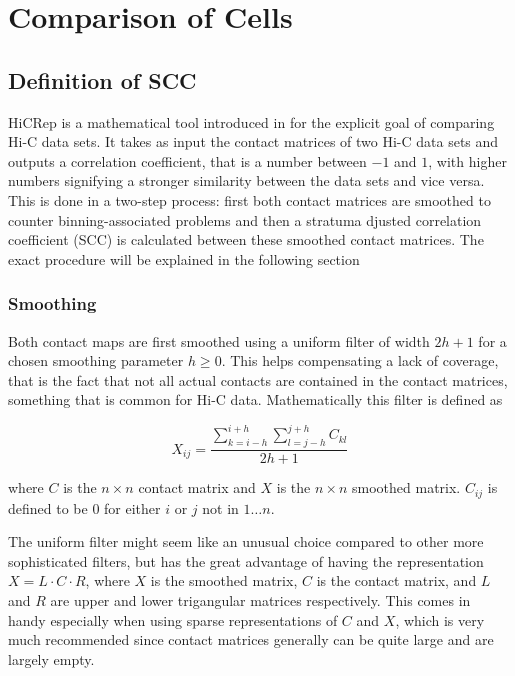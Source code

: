 
\chapter{Comparison of Cells} %
\label{cha:comparison_of_cells}

\section{Definition of SCC} %
\label{sec:definition_of_scc}

HiCRep is a mathematical tool introduced in \cite{yang_hicrep_2017} for the explicit goal of comparing Hi-C data sets. It takes as input the contact matrices of two Hi-C data sets and outputs a correlation coefficient, that is a number between \(-1\) and \(1\), with higher numbers signifying a stronger similarity between the data sets and vice versa. This is done in a two-step process: first both contact matrices are smoothed to counter binning-associated problems and then a stratuma djusted correlation coefficient (SCC) is calculated between these smoothed contact matrices. The exact procedure will be explained in the following section

\subsection{Smoothing} %
\label{subsec:smoothing}

Both contact maps are first smoothed using a uniform filter of width \(2h+1\) for a chosen smoothing parameter \(h \geq 0\). This helps compensating a lack of coverage, that is the fact that not all actual contacts are contained in the contact matrices, something that is common for Hi-C data. Mathematically this filter is defined as

\[
  X_{ij} = \frac{ \sum_{k=i-h}^{i+h} \sum_{l=j-h}^{j+h} C_{kl} }{ 2h+1 }
\]

where \(C\) is the \(n \times n\) contact matrix and \(X\) is the \(n \times n\) smoothed matrix. \(C_{ij}\) is defined to be 0 for either \(i\) or \(j\) not in \(1 \dots n\).

The uniform filter might seem like an unusual choice compared to other more sophisticated filters, but has the great advantage of having the representation \( X = L \cdot C \cdot R \), where \(X\) is the smoothed matrix, \(C\) is the contact matrix, and \(L\) and \(R\) are upper and lower trigangular matrices respectively. This comes in handy especially when using sparse representations of \(C\) and \(X\), which is very much recommended since contact matrices generally can be quite large and are largely empty.

